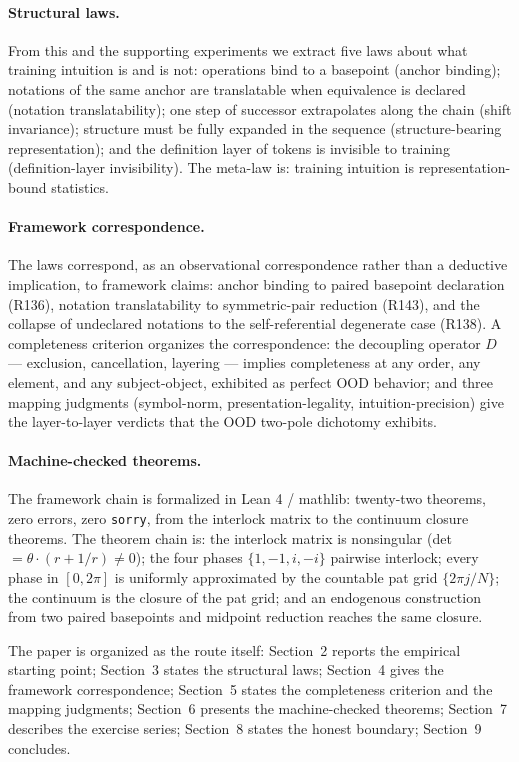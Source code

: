 \documentclass[sigplan,10pt,anonymous,review]{acmart}
\begin{document}
\paragraph{Structural laws.} From this and the supporting experiments
we extract five laws about what training intuition is and is not:
operations bind to a basepoint (anchor binding); notations of the same
anchor are translatable when equivalence is declared (notation
translatability); one step of successor extrapolates along the chain
(shift invariance); structure must be fully expanded in the sequence
(structure-bearing representation); and the definition layer of tokens
is invisible to training (definition-layer invisibility). The meta-law
is: training intuition is representation-bound statistics.

\paragraph{Framework correspondence.} The laws correspond, as an
observational correspondence rather than a deductive implication, to
framework claims: anchor binding to paired basepoint declaration
(R136), notation translatability to symmetric-pair reduction (R143),
and the collapse of undeclared notations to the self-referential
degenerate case (R138). A completeness criterion organizes the
correspondence: the decoupling operator $D$ --- exclusion, cancellation,
layering --- implies completeness at any order, any element, and any
subject-object, exhibited as perfect OOD behavior; and three mapping
judgments (symbol-norm, presentation-legality, intuition-precision)
give the layer-to-layer verdicts that the OOD two-pole dichotomy
exhibits.

\paragraph{Machine-checked theorems.} The framework chain is formalized
in Lean 4 / mathlib: twenty-two theorems, zero errors, zero
\texttt{sorry}, from the interlock matrix to the continuum closure
theorems. The theorem chain is: the interlock matrix is nonsingular
(det $= \theta \cdot (r + 1/r) \neq 0$); the four phases
$\{1, -1, i, -i\}$ pairwise interlock; every phase in
$[0, 2\pi]$ is uniformly approximated by the countable pat grid
$\{2\pi j / N\}$; the continuum is the closure of the pat grid; and an
endogenous construction from two paired basepoints and midpoint
reduction reaches the same closure.

The paper is organized as the route itself: Section~2 reports the
empirical starting point; Section~3 states the structural laws;
Section~4 gives the framework correspondence; Section~5 states the
completeness criterion and the mapping judgments; Section~6 presents
the machine-checked theorems; Section~7 describes the exercise
series; Section~8 states the honest boundary; Section~9 concludes.
\end{document}
